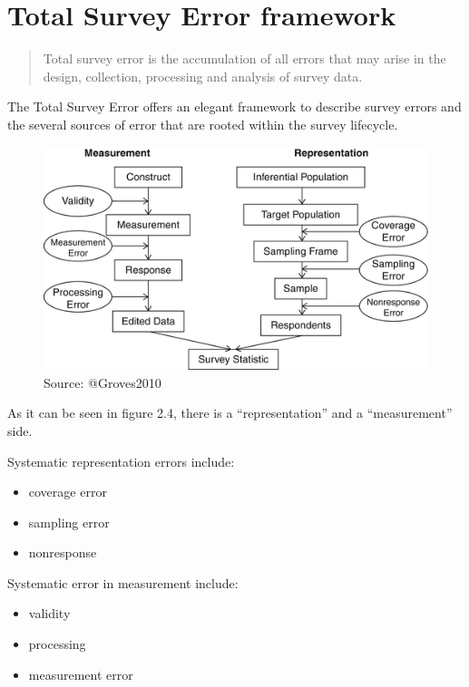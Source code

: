 \documentclass[
]{book}
\providecommand{\tightlist}{%
  \setlength{\itemsep}{0pt}\setlength{\parskip}{0pt}}
\begin{document}
\hypertarget{total-survey-error-framework}{%
\section{Total Survey Error framework}\label{total-survey-error-framework}}

\begin{quote}
Total survey error is the accumulation of all errors that may arise in the design, collection, processing and analysis of survey data.
\end{quote}

The Total Survey Error offers an elegant framework to describe survey errors and the several sources of error that are rooted within the survey lifecycle.

\begin{figure}
\includegraphics[width=0.8\linewidth]{total_survey_error} \caption{Source: @Groves2010}\label{fig:ext}
\end{figure}

As it can be seen in figure 2.4, there is a ``representation'' and a ``measurement'' side.

Systematic representation errors include:

\begin{itemize}
\tightlist
\item
  coverage error
\item
  sampling error
\item
  nonresponse
\end{itemize}

Systematic error in measurement include:

\begin{itemize}
\tightlist
\item
  validity
\item
  processing
\item
  measurement error
\end{itemize}
\end{document}

